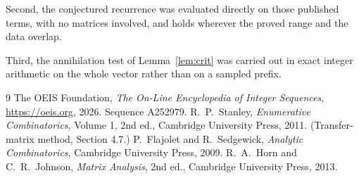 \documentclass[11pt,a4paper]{article}
\theoremstyle{plain}
\theoremstyle{definition}
\begin{document}
Second, the conjectured recurrence was evaluated directly on those published terms, with no
matrices involved, and holds wherever the proved range and the data overlap.

Third, the annihilation test of Lemma~\ref{lem:crit} was carried out in exact integer
arithmetic on the whole vector rather than on a sampled prefix.

\begin{thebibliography}{9}
 The OEIS Foundation, \emph{The On-Line Encyclopedia of Integer
Sequences}, \url{https://oeis.org}, 2026. Sequence A252979.
 R.~P.~Stanley, \emph{Enumerative Combinatorics}, Volume 1, 2nd ed.,
Cambridge University Press, 2011. (Transfer-matrix method, Section 4.7.)
 P.~Flajolet and R.~Sedgewick, \emph{Analytic Combinatorics}, Cambridge
University Press, 2009.
 R.~A.~Horn and C.~R.~Johnson, \emph{Matrix Analysis}, 2nd ed., Cambridge
University Press, 2013.
\end{thebibliography}
\end{document}
